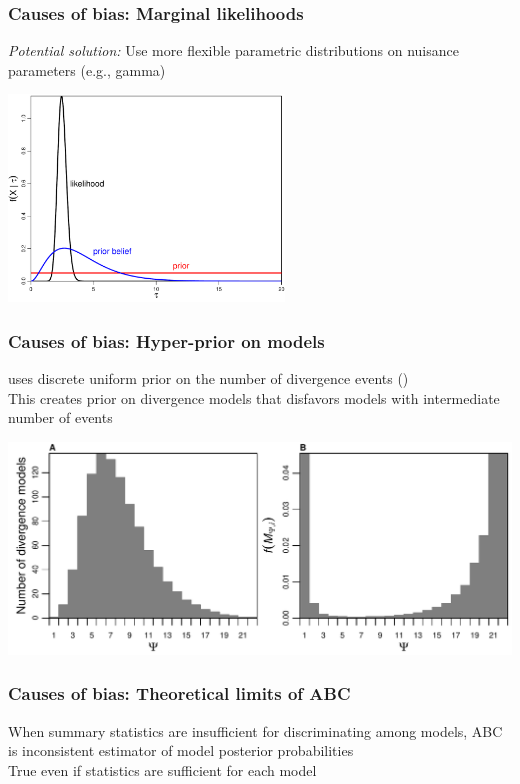 \begin{frame}
    \frametitle{Causes of bias: Marginal likelihoods}
    \begin{block}{\it Potential solution:}
        Use more flexible parametric distributions on nuisance parameters (e.g., gamma)
    \end{block}
    \smallskip
    \centerline{
    \includegraphics[height=5.5cm]{images/likelihood-vs-prior-vs-belief-example.pdf}}
\end{frame}

\begin{frame}
    \frametitle{Causes of bias: Hyper-prior on models}
    \msb uses discrete uniform prior on the number of divergence events
    (\numt{})\\
    \bigskip
    This creates prior on divergence models that disfavors models with
    intermediate number of events\\
    \bigskip
    \centerline{
    \includegraphics[width=\textwidth]{images/partition_numbers.pdf}}
\end{frame}

\begin{frame}
    \frametitle{Causes of bias: Theoretical limits of ABC}
    When summary statistics are insufficient for discriminating among models,
    ABC is inconsistent estimator of model posterior probabilities
    \\
    \bigskip
    True even if statistics are sufficient for each model\\
\end{frame}


